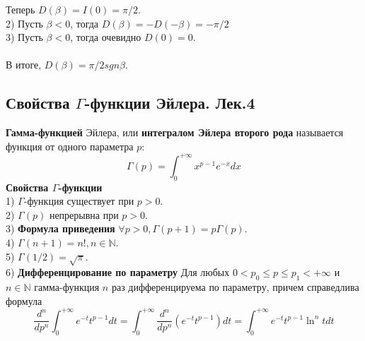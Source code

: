 \documentclass{article}
\begin{document}
	Теперь $D(\beta)=I(0)=\pi/2$.\\
	2) Пусть $\beta<0$, тогда $D(\beta)=-D(-\beta)=-\pi/2$\\
	3) Пусть $\beta<0$, тогда очевидно $D(0)=0$.\\
	\\
	В итоге, $D(\beta)=\pi/2sgn\beta$.
\subsection{Свойства $\Gamma$-функции Эйлера. Лек.4}
	\textbf{Гамма-функцией} Эйлера, или \textbf{интегралом Эйлера второго рода} называется функция от одного параметра $ p$: 
	\begin{equation}
	\label{7.1}
	\Gamma(p)=\int_{0}^{+\infty} x^{p-1} e^{-x} d x
	\end{equation}
	\textbf{Свойства $\Gamma$-функции}\\
	1) $\Gamma$-функция существует при $p>0$.\\
	2) $\Gamma(p)$ непрерывна при $p>0$.\\
	3) \textbf{Формула приведения} $\forall p>0, \Gamma(p+1)=p\Gamma(p)$.\\
	4) $\Gamma(n+1)=n!,n\in \mathbb{N}$.\\
    5) $\Gamma(1/2)=\sqrt{\pi}$.\\
	6) \textbf{Дифференцирование по параметру} Для любых $ 0<p_{0} \leqslant p \leqslant p_{1}<+\infty $ и $ n \in \mathbb{N} $ гамма-функция $ n $ раз дифференцируема по параметру, причем справедлива формула
	\begin{equation}
	\label{7.2}
	\frac{d^{n}}{d p^{n}} \int_{0}^{+\infty} e^{-t} t^{p-1} d t=\int_{0}^{+\infty} \frac{d^{n}}{d p^{n}}\left(e^{-t} t^{p-1}\right) d t=\int_{0}^{+\infty} e^{-t} t^{p-1} \ln ^{n} t d t
	\end{equation}
\end{document}
